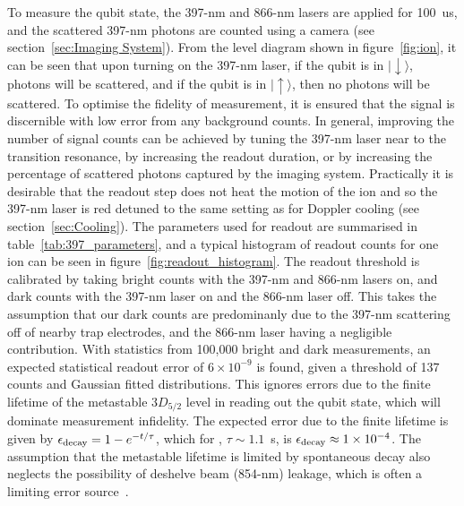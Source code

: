     To measure the qubit state, the 397-nm and 866-nm lasers
    are applied for 100~\unit{us}, and the scattered 397-nm photons are counted using a camera (see section~\ref{sec:Imaging System}). From the level diagram shown in
    figure~\ref{fig:ion}, it can be seen that upon turning on the 397-nm
    laser, if the qubit is in $|\downarrow\rangle$, photons will be scattered, and if the qubit is in
    $|\uparrow\rangle$, then no photons will be scattered. 
     To optimise the fidelity of
    measurement, it is ensured that the signal is discernible with low error from any
    background counts.
     In general, improving the number of signal
    counts can be achieved by tuning the 397-nm laser near to the transition
    resonance, by increasing the readout duration, or by increasing the
    percentage of scattered photons captured by the imaging system. Practically
    it is desirable that the readout step does not heat the motion of the ion and so
    the 397-nm laser is red detuned to the same setting as for Doppler cooling
    (see section~\ref{sec:Cooling}). The parameters used for readout are
    summarised in table~\ref{tab:397_parameters}, and a typical histogram of
    readout counts for one ion can be seen in
    figure~\ref{fig:readout_histogram}. The readout threshold is calibrated by taking bright counts with the 397-nm and 866-nm lasers on, and dark counts with the 397-nm laser on and the 866-nm laser off. This takes the assumption that our dark counts are predominanly due to the 397-nm scattering off of nearby trap electrodes, and the 866-nm laser having a negligible contribution. 
    With statistics from 100,000 bright and dark measurements, an expected
    statistical readout error of $6\times10^{-9}$  is found, given a threshold of
    137 counts and Gaussian fitted distributions. This ignores errors due to the
    finite lifetime of the metastable $3D_{5/2}$ level in reading out the qubit
    state, which will dominate measurement infidelity. The expected error due
    to the finite lifetime is given by $\epsilon_{\rm decay} = 1 - e^{-t/\tau}$,
    which for \ca, $\tau \sim 1.1$~s, is $\epsilon_{\rm decay} \approx 1\times
    10^{-4}$. The assumption that the metastable lifetime is limited by
    spontaneous decay also neglects the possibility of deshelve beam (854-nm)
    leakage, which is often a limiting error source~\cite{Abaqus SPAM}. \\
